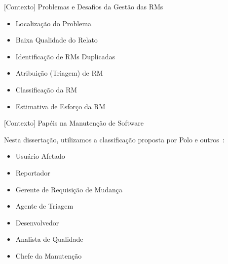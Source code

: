 \documentclass[t,14pt,mathserif]{beamer}
\begin{document}



\begin{frame}{[Contexto] Problemas e Desafios da Gestão das RMs}
	\begin{itemize}

        \item Localização do Problema
        \item Baixa Qualidade do Relato
        \item Identificação de RMs Duplicadas
        \item Atribuição (Triagem) de RM
        \item Classificação da RM
        \item Estimativa de Esforço da RM

	\end{itemize}
\end{frame}

\begin{frame}{[Contexto] Papéis na Manutenção de Software}

    Nesta dissertação, utilizamos a classificação proposta por Polo e
    outros~\cite{Polo1999}:

	\begin{itemize}
        \item Usuário Afetado
        \item Reportador
        \item Gerente de Requisição de Mudança
        \item Agente de Triagem
        \item Desenvolvedor
        \item Analista de Qualidade
        \item Chefe da Manutenção
    \end{itemize}

\end{frame}
\end{document}
